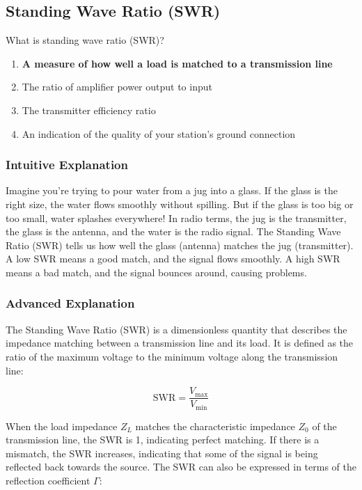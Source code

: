\subsection{Standing Wave Ratio (SWR)}
\label{T9B12}

\begin{tcolorbox}[colback=gray!10!white,colframe=black!75!black,title=T9B12]
What is standing wave ratio (SWR)?
\begin{enumerate}[label=\Alph*)]
    \item \textbf{A measure of how well a load is matched to a transmission line}
    \item The ratio of amplifier power output to input
    \item The transmitter efficiency ratio
    \item An indication of the quality of your station’s ground connection
\end{enumerate}
\end{tcolorbox}

\subsubsection{Intuitive Explanation}
Imagine you're trying to pour water from a jug into a glass. If the glass is the right size, the water flows smoothly without spilling. But if the glass is too big or too small, water splashes everywhere! In radio terms, the jug is the transmitter, the glass is the antenna, and the water is the radio signal. The Standing Wave Ratio (SWR) tells us how well the glass (antenna) matches the jug (transmitter). A low SWR means a good match, and the signal flows smoothly. A high SWR means a bad match, and the signal bounces around, causing problems.

\subsubsection{Advanced Explanation}
The Standing Wave Ratio (SWR) is a dimensionless quantity that describes the impedance matching between a transmission line and its load. It is defined as the ratio of the maximum voltage to the minimum voltage along the transmission line:

\[
\text{SWR} = \frac{V_{\text{max}}}{V_{\text{min}}}
\]

When the load impedance \( Z_L \) matches the characteristic impedance \( Z_0 \) of the transmission line, the SWR is 1, indicating perfect matching. If there is a mismatch, the SWR increases, indicating that some of the signal is being reflected back towards the source. The SWR can also be expressed in terms of the reflection coefficient \( \Gamma \):

